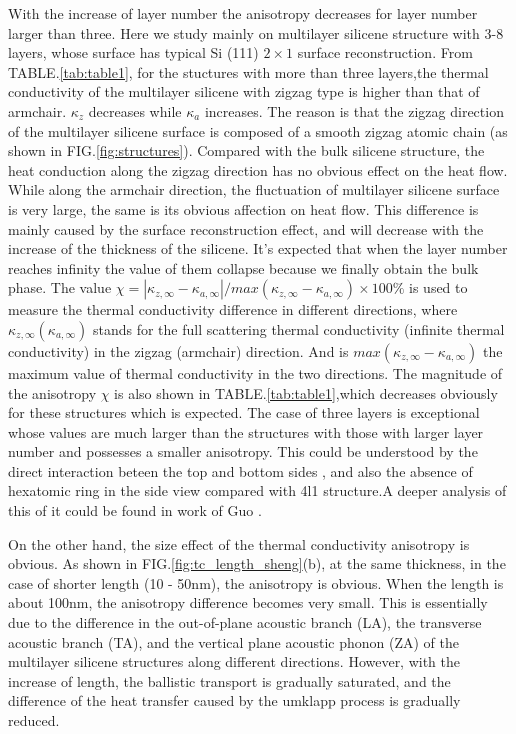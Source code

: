 \documentclass[%
 reprint,
 amsmath,amssymb,
 aps,
 prb,
]{revtex4-1}
\begin{document}
With the increase of layer number the anisotropy decreases for layer number larger than three. Here we study mainly on multilayer silicene structure with 3-8 layers, whose  surface has typical Si (111) $2 \times 1$ surface reconstruction.   From TABLE.\ref{tab:table1}, for the stuctures with more than three layers,the thermal conductivity of the multilayer silicene with zigzag type is higher than that of armchair. $\kappa_z$ decreases while $\kappa_a$ increases. The reason is that the zigzag direction of the multilayer silicene surface is composed of a smooth zigzag atomic chain (as shown in FIG.\ref{fig:structures}). Compared with the bulk silicene structure, the heat conduction along the zigzag direction has no obvious effect on the heat flow. While along the armchair direction, the fluctuation of multilayer silicene surface is very large, the same is its obvious affection on heat flow. This difference is mainly caused by the surface reconstruction effect, and will decrease with the increase of the thickness of the silicene. It's expected that when the layer number reaches infinity the value of them collapse because we finally obtain the bulk phase. The value $ \chi=|\kappa_{z,\infty}-\kappa_{a,\infty} |/max⁡(\kappa_{z,\infty}-\kappa_{a,\infty} ) \times 100 \%$ is used to measure the thermal conductivity difference in different directions, where $ \kappa_{z,\infty} (\kappa_{a,\infty})$ stands for the full scattering thermal conductivity (infinite thermal conductivity) in the zigzag (armchair) direction. And is $ max⁡(\kappa_{z,\infty}-\kappa_{a,\infty} ) $ the maximum value of thermal conductivity in the two directions. The magnitude of the anisotropy $\chi$ is also shown in TABLE.\ref{tab:table1},which  decreases obviously for these structures which is expected. The case of three layers is exceptional whose values are much larger than the structures with those with larger layer number and possesses a smaller anisotropy. This could be understood by the direct interaction beteen the top and bottom sides , and also the absence of hexatomic ring in the side view compared with 4l1 structure.A deeper analysis of this of it could be found in work of Guo \cite{Guo2015Structural}.


On the other hand, the size effect of the thermal conductivity anisotropy is obvious. As shown in FIG.\ref{fig:tc_length_sheng}(b), at the same thickness, in the case of shorter length (10 - 50nm), the anisotropy is obvious. When the length is about 100nm, the anisotropy difference becomes very small. This is essentially due to the difference in the out-of-plane acoustic branch (LA), the transverse acoustic branch (TA), and the vertical plane acoustic phonon (ZA) of the multilayer silicene structures along different directions. However, with the increase of length, the ballistic transport is gradually saturated, and the difference of the heat transfer caused by the umklapp process is gradually reduced.
\end{document}
